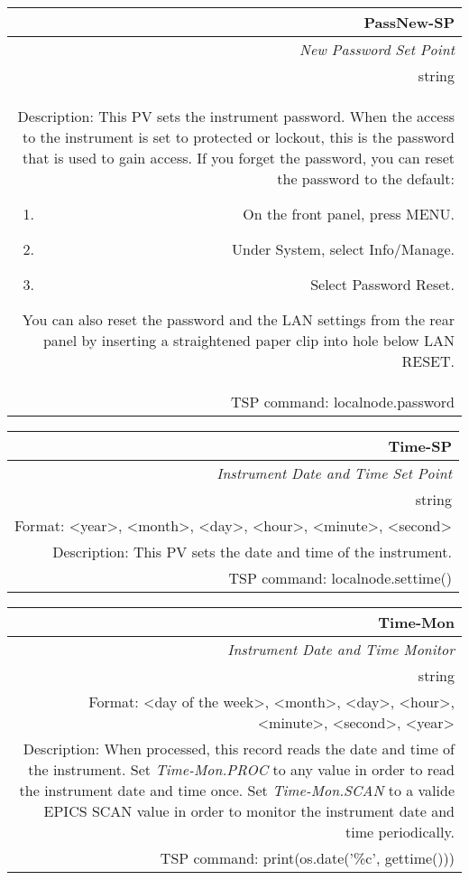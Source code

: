 \documentclass[openany]{article}
\begin{document}
		\begin{tabular}{N}
			\hline
			\bfseries PassNew-SP\label{pv:passnew-sp} \\ \hline
			\emph{New Password Set Point} \\
			string \\
			Description: This PV sets the instrument password. When the access to the instrument is set to protected or lockout, this is the password that is used to gain access. If you forget the password, you can reset the password to the default: \begin{enumerate} \item On the front panel, press MENU. \item Under System, select Info/Manage. \item Select Password Reset. \end{enumerate} You can also reset the password and the LAN settings from the rear panel by inserting a straightened paper clip into hole below LAN RESET. \\
			TSP command: localnode.password
		\end{tabular}

		\begin{tabular}{N}
			\hline
			\bfseries Time-SP\label{pv:time-sp} \\ \hline
			\emph{Instrument Date and Time Set Point} \\
			string \\
			Format: \textless year\textgreater, \textless month\textgreater, \textless day\textgreater, \textless hour\textgreater, \textless minute\textgreater, \textless second\textgreater \\
			Description: This PV sets the date and time of the instrument. \\
			TSP command: localnode.settime()
		\end{tabular}

		\begin{tabular}{N}
			\hline
			\bfseries Time-Mon\label{pv:time-mon} \\ \hline
			\emph{Instrument Date and Time Monitor} \\
			string \\
			Format: \textless day of the week\textgreater, \textless month\textgreater, \textless day\textgreater, \textless hour\textgreater, \textless minute\textgreater, \textless second\textgreater, \textless year\textgreater \\
			Description: When processed, this record reads the date and time of the instrument. Set \emph{Time-Mon.PROC} to any value in order to read the instrument date and time once. Set \emph{Time-Mon.SCAN} to a valide EPICS SCAN value in order to monitor the instrument date and time periodically. \\
			TSP command: print(os.date('\%c', gettime()))
		\end{tabular}
\end{document}

